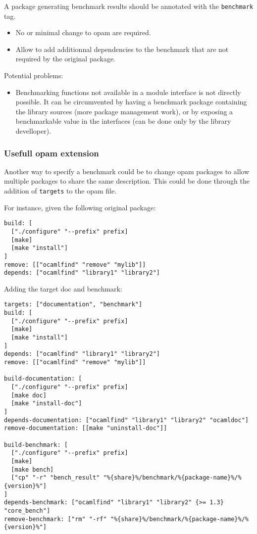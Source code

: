 \documentclass[11pt,a4paper]{article}
\begin{document}
A package generating benchmark results should be annotated with the
\texttt{benchmark} tag.

\begin{itemize}
\item No or minimal change to opam are required.
\item Allow to add additionnal dependencies to the benchmark that are
  not required by the original package.
\end{itemize}

Potential problems:
\begin{itemize}
\item Benchmarking functions not available in a module interface is
  not directly possible. It can be circumvented by having a benchmark
  package containing the library sources (more package management
  work), or by exposing a benchmarkable value in the interfaces (can
  be done only by the library develloper).
\end{itemize}

\subsubsection{Usefull opam extension}

Another way to specify a benchmark could be to change opam packages to
allow multiple packages to share the same description. This could be
done through the addition of {\tt targets} to the opam file.

For instance, given the following original package:

\begin{verbatim}
build: [
  ["./configure" "--prefix" prefix]
  [make]
  [make "install"]
]
remove: [["ocamlfind" "remove" "mylib"]]
depends: ["ocamlfind" "library1" "library2"]
\end{verbatim}

Adding the target doc and benchmark:

\begin{verbatim}
targets: ["documentation", "benchmark"]
build: [
  ["./configure" "--prefix" prefix]
  [make]
  [make "install"]
]
depends: ["ocamlfind" "library1" "library2"]
remove: [["ocamlfind" "remove" "mylib"]]

build-documentation: [
  ["./configure" "--prefix" prefix]
  [make doc]
  [make "install-doc"]
]
depends-documentation: ["ocamlfind" "library1" "library2" "ocamldoc"]
remove-documentation: [[make "uninstall-doc"]]

build-benchmark: [
  ["./configure" "--prefix" prefix]
  [make]
  [make bench]
  ["cp" "-r" "bench_result" "%{share}%/benchmark/%{package-name}%/%{version}%"]
]
depends-benchmark: ["ocamlfind" "library1" "library2" {>= 1.3} "core_bench"]
remove-benchmark: ["rm" "-rf" "%{share}%/benchmark/%{package-name}%/%{version}%"]
\end{verbatim}
\end{document}
